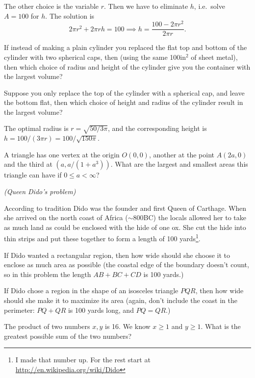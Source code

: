 \begin{multicols}{2}
The other choice is the variable $r$.  Then we have to eliminate $h$,
i.e.~solve $A=100$ for $h$.  The solution is
\[
2\pi r^2 + 2\pi rh = 100 \implies
h = \frac{100 - 2\pi r^2} {2\pi r}.
\]

\endanswer

\subprob If instead of making a plain cylinder you replaced the
flat top and bottom of the cylinder with two spherical caps, then
(using the same 100in$^2$ of sheet metal), then which choice of
radius and height of the cylinder give you the container with the
largest volume?

\subprob Suppose you only replace the top of the cylinder with a
spherical cap, and leave the bottom flat, then which choice of height
and radius of the cylinder result in the largest volume?

\answer
The optimal radius is $r = \sqrt{50/3\pi}$, and the corresponding
height is $h = 100/(3\pi r) = 100/\sqrt{150\pi}$.
\endanswer





\problem A triangle has one vertex at the origin $O(0,0)$, another at the
point $A(2a,0)$ and the third at $(a, a/(1+a^3))$.  What are the largest
and smallest areas this triangle can have if $0\leq a<\infty$?

\problem \groupproblem \textit{(Queen Dido's problem)}

According to tradition Dido was the founder and first Queen of
Carthage.  When she arrived on the north coast of Africa
($\sim$800BC) the locals allowed her to take as much land as could be
enclosed with the hide of one ox.  She cut the hide into thin strips
and put these together to form a length of 100 yards\footnote{I made
that number up.  For the rest start at
\url{http://en.wikipedia.org/wiki/Dido}}.



\subprob \rule{0pt}{14pt} If Dido wanted a rectangular region,
then how wide should she choose it to enclose as much area as
possible (the coastal edge of the boundary doesn't count, so in this
problem the length $AB+BC+CD$ is 100 yards.)

\subprob If Dido chose a region in the shape of an isosceles
triangle $PQR$, then how wide should she make it to maximize its area
(again, don't include the coast in the perimeter: $PQ+QR$ is 100
yards long, and $PQ=QR$.)


\problem The product of two numbers $x, y$ is 16. We know $x\geq 1$ and $y
\geq1$. What is the greatest possible sum of the two numbers? 



\end{multicols}
